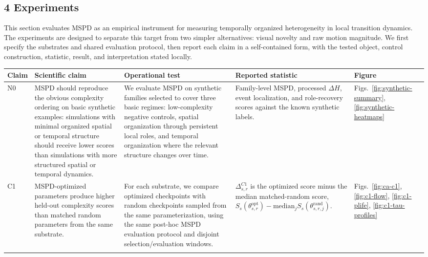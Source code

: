 \subsection{4 Experiments}
\label{experiments}

This section evaluates MSPD as an empirical instrument for measuring temporally organized heterogeneity in local transition dynamics. The experiments are designed to separate this target from two simpler alternatives: visual novelty and raw motion magnitude. We first specify the substrates and shared evaluation protocol, then report each claim in a self-contained form, with the tested object, control construction, statistic, result, and interpretation stated locally.


\begin{table}[t]
\centering
\scriptsize
\setlength{\tabcolsep}{3pt}
\renewcommand{\arraystretch}{1.18}
\begin{tabular}{@{}p{}p{}p{}p{}p{}@{}}
\toprule
Claim & Scientific claim & Operational test & Reported statistic & Figure \\
\midrule
N0
& MSPD should reproduce the obvious complexity ordering on basic synthetic examples: simulations with minimal organized spatial or temporal structure should receive lower scores than simulations with more structured spatial or temporal dynamics.
& We evaluate MSPD on synthetic families selected to cover three basic regimes: low-complexity negative controls, spatial organization through persistent local roles, and temporal organization where the relevant structure changes over time.
& Family-level MSPD, processed $\Delta H$, event localization, and role-recovery scores against the known synthetic labels.
& Figs.~\ref{fig:synthetic-summary}, \ref{fig:synthetic-heatmaps} \\
\addlinespace[0.60em]

C1
& MSPD-optimized parameters produce higher held-out complexity scores than matched random parameters from the same substrate.
& For each substrate, we compare optimized checkpoints with random checkpoints sampled from the same parameterization, using the same post-hoc MSPD evaluation protocol and disjoint selection/evaluation windows.
& $\Delta^{C1}_{s,r}$ is the optimized score minus the median matched-random score, $S_s(\theta^{\mathrm{opt}}_{s,r})-\mathrm{median}_{j}S_s(\theta^{\mathrm{rand}}_{s,r,j})$.
& Figs.~\ref{fig:ca-c1}, \ref{fig:c1-flow}, \ref{fig:c1-plife}, \ref{fig:c1-tau-profiles} \\
\addlinespace[0.60em]


\end{tabular}
\end{table}
